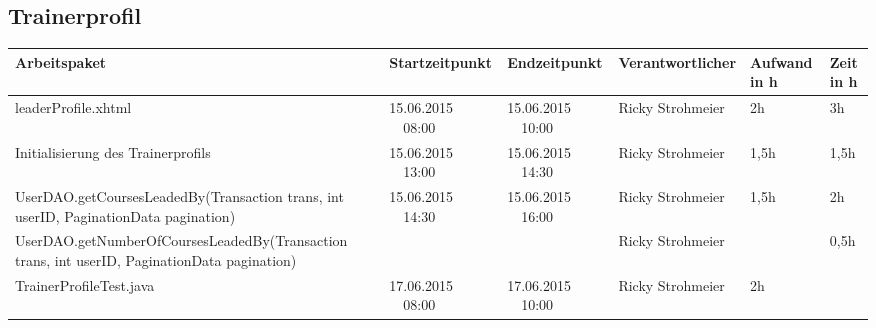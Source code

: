 \begin{landscape}
	\subsection{Trainerprofil}
	\begin{tabular}{|p{10.3cm}|p{3.2cm}|p{3.2cm}|p{3.5cm}|p{1.7cm}|p{1.5cm}|}
		\hline  \textbf{Arbeitspaket} & \textbf{Startzeitpunkt} & \textbf{Endzeitpunkt} & \textbf{Verantwortlicher}  & \textbf{Aufwand in h} & \textbf{Zeit in h}\\
		\hline   leaderProfile.xhtml                      & 15.06.2015 \ \ 08:00        & 15.06.2015 \ \ 10:00        & Ricky Strohmeier &  2h                 &   3h\\
		\hline   Initialisierung des Trainerprofils& 15.06.2015 \ \ 13:00        & 15.06.2015 \ \ 14:30        & Ricky Strohmeier &  1,5h       & 1,5h \\
		\hline   UserDAO.getCoursesLeadedBy(Transaction trans, int userID, PaginationData pagination)  & 15.06.2015 \ \ 14:30        & 15.06.2015 \ \ 16:00   &  Ricky  Strohmeier &  1,5h  & 2h\\
		\hline   UserDAO.getNumberOfCoursesLeadedBy(Transaction trans, int userID, PaginationData pagination)  &      &    &  Ricky  Strohmeier &   & 0,5h\\
		\hline   TrainerProfileTest.java  & 17.06.2015 \ \ 08:00        & 17.06.2015 \ \ 10:00        & Ricky Strohmeier &  2h  &    \\
		\hline 
	\end{tabular} \ \\
	\ \\
	

\end{landscape}
